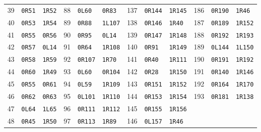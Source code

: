 \begin{center}
\begin{tabular}{rll@{\qquad}rll@{\qquad}rll@{\qquad}rll}
39 & \texttt{0R51} & \texttt{1R52} & 88 & \texttt{0L60} & \texttt{0R83} & 137 & \texttt{0R144} & \texttt{1R145} & 186 & \texttt{0R190} & \texttt{1R46}\\
40 & \texttt{0R53} & \texttt{1R54} & 89 & \texttt{0R88} & \texttt{1L107} & 138 & \texttt{0R146} & \texttt{1R40} & 187 & \texttt{0R189} & \texttt{1R152}\\
41 & \texttt{0R55} & \texttt{0R56} & 90 & \texttt{0R95} & \texttt{0L14} & 139 & \texttt{0R147} & \texttt{1R148} & 188 & \texttt{0R192} & \texttt{1R193}\\
42 & \texttt{0R57} & \texttt{0L14} & 91 & \texttt{0R64} & \texttt{1R108} & 140 & \texttt{0R91} & \texttt{1R149} & 189 & \texttt{0L144} & \texttt{1L150}\\
43 & \texttt{0R58} & \texttt{1R59} & 92 & \texttt{0R107} & \texttt{1R70} & 141 & \texttt{0R40} & \texttt{1R111} & 190 & \texttt{0R191} & \texttt{1R192}\\
44 & \texttt{0R60} & \texttt{1R49} & 93 & \texttt{0L60} & \texttt{0R104} & 142 & \texttt{0R28} & \texttt{1R150} & 191 & \texttt{0R140} & \texttt{1R146}\\
45 & \texttt{0R55} & \texttt{0R61} & 94 & \texttt{0L59} & \texttt{1R109} & 143 & \texttt{0R151} & \texttt{1R152} & 192 & \texttt{0R164} & \texttt{1R170}\\
46 & \texttt{0R62} & \texttt{0R63} & 95 & \texttt{0L101} & \texttt{1R110} & 144 & \texttt{0R153} & \texttt{1R154} & 193 & \texttt{0R181} & \texttt{1R138}\\
47 & \texttt{0L64} & \texttt{1L65} & 96 & \texttt{0R111} & \texttt{1R112} & 145 & \texttt{0R155} & \texttt{1R156} &  &  & \\
48 & \texttt{0R45} & \texttt{1R50} & 97 & \texttt{0R113} & \texttt{1R89} & 146 & \texttt{0L157} & \texttt{1R46} &  &  & \\
\bottomrule
\end{tabular}
\end{center}
